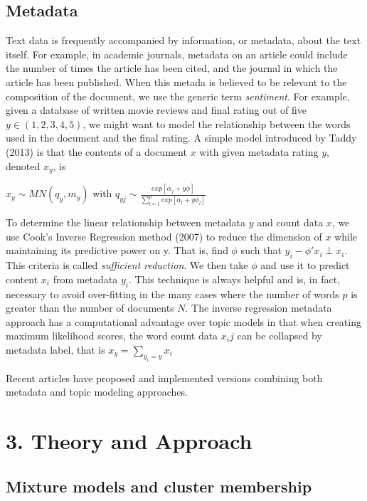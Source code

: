 \documentclass[]{article}
\begin{document}
\subsection{Metadata}\label{metadata}

Text data is frequently accompanied by information, or metadata, about
the text itself. For example, in academic journals, metadata on an
article could include the number of times the article has been cited,
and the journal in which the article has been published. When this
metada is believed to be relevant to the composition of the document, we
use the generic term \emph{sentiment}. For example, given a database of
written movie reviews and final rating out of five $y \in (1,2,3,4,5)$,
we might want to model the relationship between the words used in the
document and the final rating. A simple model introduced by Taddy (2013)
is that the contents of a document $x$ with given metadata rating $y$,
denoted $x_y$, is

$x_y \sim MN(q_y,m_y)$ with
$q_{yj} \sim \frac{exp[\alpha_j + y \phi]}{\sum_{l=1}^{p} exp[\alpha_l + y \phi_l]}$

To determine the linear relationship between metadata $y$ and count data
$x$, we use Cook's Inverse Regression method (2007) to reduce the
dimension of $x$ while maintaining its predictive power on y. That is,
find $\phi$ such that $y_i - \phi' x_i \perp x_i$. This criteria is
called \emph{sufficient reduction}. We then take $\phi$ and use it to
predict content $x_i$ from metadata $y_i$. This technique is always
helpful and is, in fact, necessary to avoid over-fitting in the many
cases where the number of words $p$ is greater than the number of
documents $N$. The inverse regression metadata approach has a
computational advantage over topic models in that when creating maximum
likelihood scores, the word count data $x_ij$ can be collapsed by
metadata label, that is $x_y = \sum_{y_{i} = y}{x_i}$

Recent articles have proposed and implemented versions combining both
metadata and topic modeling approaches.

\section{3. Theory and Approach}\label{theory-and-approach}

\subsection{Mixture models and cluster
membership}\label{mixture-models-and-cluster-membership}
\end{document}
